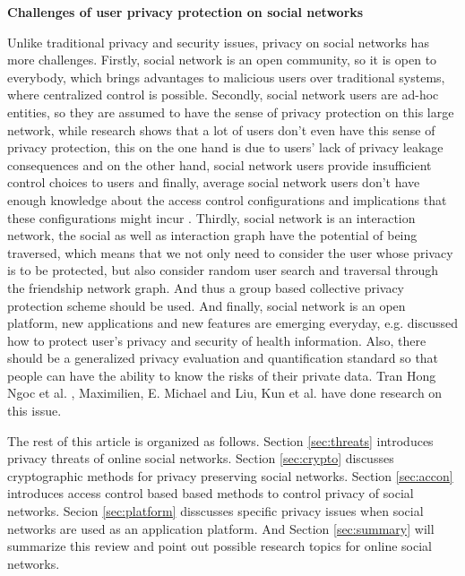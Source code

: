 \documentclass[12pt]{article}
\begin{document}
\textbf{Challenges of user privacy protection on social networks}

Unlike traditional privacy and security issues, privacy on social
networks has more challenges. Firstly, social network is an open
community, so it is open to everybody, which brings advantages to
malicious users over traditional systems, where centralized control is
possible. Secondly, social network users are ad-hoc entities, so they
are assumed to have the sense of privacy protection on this large
network, while research shows that a lot of users don't even have this
sense of privacy protection\cite{privacy-wizard}, this on the one hand
is due to users' lack of privacy leakage consequences and on the other
hand, social network users provide insufficient control choices to
users and finally, average social network users don't have enough
knowledge about the access control configurations and implications
that these configurations might incur\cite{privacy-wizard}
\cite{Anwar_visualizingprivacy}. Thirdly, social network is an
interaction network, the social as well as interaction
graph\cite{user-interaction-social-link} have the potential of being
traversed, which means that we not only need to consider the user
whose privacy is to be protected, but also consider random user search
and traversal through the friendship network graph. And thus a group
based collective privacy protection scheme should be used. And
finally, social network is an open platform, new applications and new
features are emerging everyday, e.g. \cite{social-healthcare-privacy}
discussed how to protect user's privacy and security of health
information. Also, there should be a generalized privacy evaluation
and quantification standard so that people can have the ability to
know the risks of their private data. Tran Hong Ngoc et
al. \cite{SN-quantify-privacy}, Maximilien, E. Michael
\cite{privacy-fundamental-construct} and Liu, Kun et
al. \cite{SN-privacy-score} have done research on this issue.

The rest of this article is organized as follows. Section
\ref{sec:threats} introduces privacy threats of online social
networks. Section \ref{sec:crypto} discusses cryptographic methods for
privacy preserving social networks. Section \ref{sec:accon}
introduces access control based based methods to control privacy of
social networks. Secion \ref{sec:platform} disscusses specific
privacy issues when social networks are used as an application
platform. And Section \ref{sec:summary} will summarize this review and
point out possible research topics for online social networks.
\end{document}
